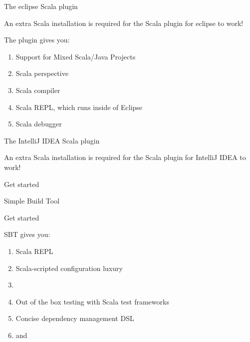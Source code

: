 \begin{frame}{The eclipse Scala plugin}
\begin{center}
\end{center}
\begin{center}
An extra Scala installation is  required for the Scala
plugin for eclipse to work!
\end{center}
The plugin gives you:
\begin{enumerate}
  \item Support for Mixed Scala/Java Projects
  \item Scala perspective
  \item Scala compiler
  \item Scala REPL, which runs inside of Eclipse
  \item Scala debugger
\end{enumerate}
\end{frame}

\begin{frame}{The IntelliJ IDEA Scala plugin}
\begin{center}
\end{center}
\begin{center}
An extra Scala installation \alert{is} required for the Scala
plugin for IntelliJ IDEA to work!
\end{center}
\begin{center}
Get started 
\end{center}
\end{frame}

\begin{frame}{Simple Build Tool}
\begin{center}
\end{center}
\begin{center}
Get started
\end{center}
SBT gives you:
\begin{enumerate}
  \item Scala REPL
  \item Scala-scripted configuration luxury
  \item {}
  \item Out of the box testing with Scala test frameworks
  \item Concise dependency management DSL
  \item and 
\end{enumerate}
\end{frame}

